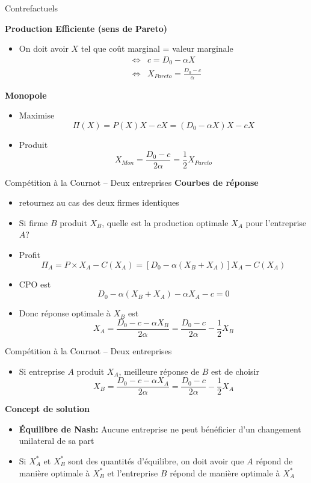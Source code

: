 \documentclass[handout]{beamer}
\newenvironment{iPar}[1]{\textbf{#1} \begin{itemize}}{\end{itemize}}
\newcommand{\mdp}{\medskip \pause}
\begin{document}
\begin{frame}{Contrefactuels}

\begin{iPar}{Production Efficiente (sens de Pareto)}
\item On doit avoir $X$ tel que coût marginal = valeur marginale
\begin{eqnarray*} &\iff& c = D_0 - \alpha X \\ &\iff& X_{Pareto} = \frac{D_0 - c}{\alpha} \end{eqnarray*}
\end{iPar} \mdp


\begin{iPar}{Monopole}
\item Maximise $$\Pi(X) =  P(X) X - c X = (D_0- \alpha X) X - c X$$
\item Produit $$X_{Mon} = \frac{D_0 - c}{2\alpha} = \frac{1}{2} X_{Pareto}$$

\end{iPar}

\end{frame}


\begin{frame}{Compétition à la Cournot -- Deux entreprises}
\begin{iPar}{Courbes de réponse}
\item retournez au cas des deux firmes identiques
\item Si firme $B$ produit $X_B$, quelle est la production optimale $X_A$ pour l'entreprise $A$? \pause
\item Profit $$\Pi_A = P \times X_A - C(X_A) = [D_0 - \alpha(X_B + X_A)]X_A - C(X_A)$$
\item CPO est $$ D_0 -   \alpha(X_B + X_A) - \alpha X_A - c  = 0$$
\item Donc réponse optimale  à $X_B$ est  $$X_A = \frac{D_0 -  c - \alpha X_B}{ 2 \alpha} = \frac{D_0 - c}{2\alpha} - \frac{1}{2}X_B$$
\end{iPar}
\end{frame}


\begin{frame}{Compétition à la Cournot -- Deux entreprises}
\begin{itemize}
\item Si entreprise $A$ produit $X_A$, meilleure réponse de $B$ est de choisir
$$X_B =   \frac{D_0 -  c - \alpha X_A}{ 2 \alpha} = \frac{D_0 - c}{2\alpha} - \frac{1}{2}X_A $$
\end{itemize}\mdp

\begin{iPar}{Concept de solution}
\item \textbf{Équilibre de Nash:} Aucune entreprise ne peut bénéficier d'un changement unilateral de sa part

\item Si $X^*_A$ et $X^*_B$ sont des quantités d'équilibre, on doit avoir que $A$ répond de manière optimale à $X^*_B$ et l'entreprise $B$ répond de manière optimale à $X^*_A$
\end{iPar}
\end{frame}
\end{document}
